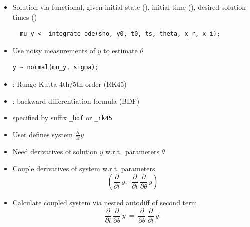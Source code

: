 \documentclass[10pt]{report}
\begin{document}
%
\begin{itemize}
\item Solution via functional, given initial state (), 
initial time (), desired solution times ()
{\footnotesize
\begin{Verbatim}
  mu_y <- integrate_ode(sho, y0, t0, ts, theta, x_r, x_i);
\end{Verbatim}
}
\item Use noisy measurements of $y$ to estimate $\theta$
\begin{Verbatim}
y ~ normal(mu_y, sigma);
\end{Verbatim}
\end{itemize}


%
\begin{itemize}
\item {}: Runge-Kutta 4th/5th order (RK45)
\item {}:  backward-differentiation formula (BDF)
\item specified by suffix \Verb|_bdf| or \Verb|_rk45|
\end{itemize}


%
\begin{itemize}
\item User defines system $\frac{\partial}{\partial t} y$
\item Need derivatives of solution $y$ w.r.t.\ parameters $\theta$
\item Couple derivatives of system  w.r.t. parameters
\[
\left( 
\frac{\partial}{\partial t} \, y, \ \
\frac{\partial}{\partial t} \, \frac{\partial}{\partial \theta} \, y
\right)
\]
\item Calculate coupled system via nested autodiff of second term
\[
\frac{\partial}{\partial t} \, \frac{\partial}{\partial \theta} \, y
\ = \ 
\frac{\partial}{\partial \theta} \, \frac{\partial}{\partial t} \, y.
\]
\end{itemize}
\end{document}
